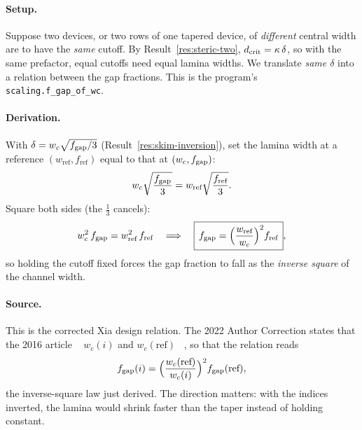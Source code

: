 \label{res:cross-width}

\paragraph{Setup.} Suppose two devices, or two rows of one tapered device, of \emph{different}
central width are to have the \emph{same} cutoff. By Result~\ref{res:steric-two},
$d_{\mathrm{crit}}=\kappa\,\delta$, so with the same prefactor, equal cutoffs need equal lamina widths. We translate \emph{same
$\delta$} into a relation between the gap fractions. This is the program's
\texttt{scaling.f\_gap\_of\_wc}.

\paragraph{Derivation.} With $\delta = w_c\sqrt{f_{\mathrm{gap}}/3}$ (Result~\ref{res:skim-inversion}),
set the lamina width at a reference $(w_{\text{ref}}, f_{\text{ref}})$ equal to that at
$(w_c, f_{\mathrm{gap}})$:
\begin{equation}
w_c\sqrt{\frac{f_{\mathrm{gap}}}{3}} = w_{\text{ref}}\sqrt{\frac{f_{\text{ref}}}{3}}.
\end{equation}
Square both sides (the $\tfrac13$ cancels):
\begin{equation}
w_c^2\, f_{\mathrm{gap}} = w_{\text{ref}}^2\, f_{\text{ref}}
\quad\Longrightarrow\quad
\boxed{\,f_{\mathrm{gap}} = \Big(\frac{w_{\text{ref}}}{w_c}\Big)^{2} f_{\text{ref}}\,},
\label{eq:r7}
\end{equation}
so holding the cutoff fixed forces the gap fraction to fall as the \emph{inverse square} of the
channel width.

\paragraph{Source.} This is the corrected Xia design relation. The 2022 Author Correction
states that the 2016 article
~\cite[p.~1]{b3}
$w_c(i)$ and $w_c(\mathrm{ref})$ ~\cite[p.~1]{b3},
so that the relation reads
\begin{equation}
f_{\mathrm{gap}}(i) = \Big(\frac{w_c(\text{ref})}{w_c(i)}\Big)^{2} f_{\mathrm{gap}}(\text{ref}),
\end{equation}
the inverse-square law just derived. The direction matters: with the indices inverted, the
lamina would shrink faster than the taper instead of holding constant.

